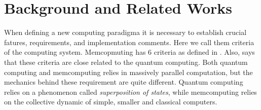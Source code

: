 \section{Background and Related Works}
\label{sec:back}

When defining a new computing paradigma it is necessary to establish crucial fatures, requirements, and implementation comments.
Here we call them criteria of the computing system.
Memcopmuting has 6 criteria as defined in \citep{DiVentra:2012fh}.
Also, \citep{DiVentra:2012fh} says that these criteria are close related to the quantum computing.
Both quantum computing and memcomputing relies in massively parallel computation, but the mechanics behind these requirement are quite different.
Quantum computing relies on a phenomenon called \emph{superposition of states}, while memcomputing relies on the collective dynamic of simple, smaller and classical computers.
